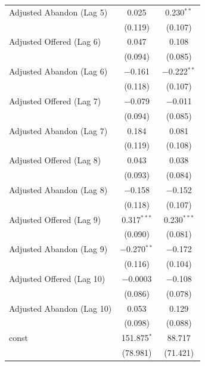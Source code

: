 \documentclass[manuscript,screen,authorversion]{acmart}
\begin{document}
\begin{table}[!htbp]
\begin{tabularx}{0.92\linewidth}{@{\extracolsep{\fill}}>{\raggedright\arraybackslash}Xcc}
Adjusted Abandon (Lag 5)  & 0.025 & 0.230$^{**}$ \\
 & {\scriptsize (0.119)} & {\scriptsize (0.107)} \\

Adjusted Offered (Lag 6)  & 0.047 & 0.108 \\
 & {\scriptsize (0.094)} & {\scriptsize (0.085)} \\

Adjusted Abandon (Lag 6)  & $-$0.161 & $-$0.222$^{**}$ \\
 & {\scriptsize (0.118)} & {\scriptsize (0.107)} \\

Adjusted Offered (Lag 7)  & $-$0.079 & $-$0.011 \\
 & {\scriptsize (0.094)} & {\scriptsize (0.085)} \\

Adjusted Abandon (Lag 7)  & 0.184 & 0.081 \\
 & {\scriptsize (0.119)} & {\scriptsize (0.108)} \\

Adjusted Offered (Lag 8)  & 0.043 & 0.038 \\
 & {\scriptsize (0.093)} & {\scriptsize (0.084)} \\

Adjusted Abandon (Lag 8)  & $-$0.158 & $-$0.152 \\
 & {\scriptsize (0.118)} & {\scriptsize (0.107)} \\

Adjusted Offered (Lag 9)  & 0.317$^{***}$ & 0.230$^{***}$ \\
 & {\scriptsize (0.090)} & {\scriptsize (0.081)} \\

Adjusted Abandon (Lag 9)  & $-$0.270$^{**}$ & $-$0.172 \\
 & {\scriptsize (0.116)} & {\scriptsize (0.104)} \\

Adjusted Offered (Lag 10) & $-$0.0003 & $-$0.108 \\
 & {\scriptsize (0.086)} & {\scriptsize (0.078)} \\

Adjusted Abandon (Lag 10) & 0.053 & 0.129 \\
 & {\scriptsize (0.098)} & {\scriptsize (0.088)} \\

const & 151.875$^{*}$ & 88.717 \\
 & {\scriptsize (78.981)} & {\scriptsize (71.421)} \\


\end{tabularx}
\end{table}
\end{document}

